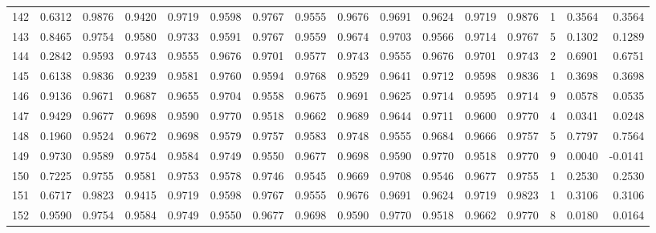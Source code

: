 \begin{tabular}{lrrrrrrrrrrrrrrr}
142 &      0.6312 &  0.9876 &  0.9420 &  0.9719 &  0.9598 &  0.9767 &  0.9555 &  0.9676 &  0.9691 &  0.9624 &   0.9719 &     0.9876 &      1 &                    0.3564 &                     0.3564 \\
143 &      0.8465 &  0.9754 &  0.9580 &  0.9733 &  0.9591 &  0.9767 &  0.9559 &  0.9674 &  0.9703 &  0.9566 &   0.9714 &     0.9767 &      5 &                    0.1302 &                     0.1289 \\
144 &      0.2842 &  0.9593 &  0.9743 &  0.9555 &  0.9676 &  0.9701 &  0.9577 &  0.9743 &  0.9555 &  0.9676 &   0.9701 &     0.9743 &      2 &                    0.6901 &                     0.6751 \\
145 &      0.6138 &  0.9836 &  0.9239 &  0.9581 &  0.9760 &  0.9594 &  0.9768 &  0.9529 &  0.9641 &  0.9712 &   0.9598 &     0.9836 &      1 &                    0.3698 &                     0.3698 \\
146 &      0.9136 &  0.9671 &  0.9687 &  0.9655 &  0.9704 &  0.9558 &  0.9675 &  0.9691 &  0.9625 &  0.9714 &   0.9595 &     0.9714 &      9 &                    0.0578 &                     0.0535 \\
147 &      0.9429 &  0.9677 &  0.9698 &  0.9590 &  0.9770 &  0.9518 &  0.9662 &  0.9689 &  0.9644 &  0.9711 &   0.9600 &     0.9770 &      4 &                    0.0341 &                     0.0248 \\
148 &      0.1960 &  0.9524 &  0.9672 &  0.9698 &  0.9579 &  0.9757 &  0.9583 &  0.9748 &  0.9555 &  0.9684 &   0.9666 &     0.9757 &      5 &                    0.7797 &                     0.7564 \\
149 &      0.9730 &  0.9589 &  0.9754 &  0.9584 &  0.9749 &  0.9550 &  0.9677 &  0.9698 &  0.9590 &  0.9770 &   0.9518 &     0.9770 &      9 &                    0.0040 &                    -0.0141 \\
150 &      0.7225 &  0.9755 &  0.9581 &  0.9753 &  0.9578 &  0.9746 &  0.9545 &  0.9669 &  0.9708 &  0.9546 &   0.9677 &     0.9755 &      1 &                    0.2530 &                     0.2530 \\
151 &      0.6717 &  0.9823 &  0.9415 &  0.9719 &  0.9598 &  0.9767 &  0.9555 &  0.9676 &  0.9691 &  0.9624 &   0.9719 &     0.9823 &      1 &                    0.3106 &                     0.3106 \\
152 &      0.9590 &  0.9754 &  0.9584 &  0.9749 &  0.9550 &  0.9677 &  0.9698 &  0.9590 &  0.9770 &  0.9518 &   0.9662 &     0.9770 &      8 &                    0.0180 &                     0.0164 \\

\end{tabular}

